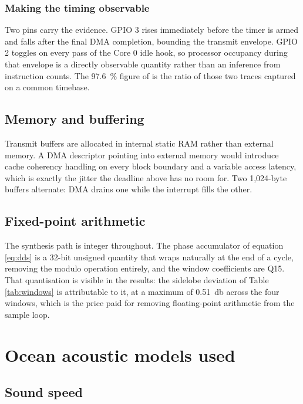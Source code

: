 \documentclass[conference,a4paper]{IEEEtran}
\begin{document}
\subsubsection{Making the timing observable}

Two pins carry the evidence. GPIO 3 rises immediately before the timer is armed
and falls after the final DMA completion, bounding the transmit envelope. GPIO 2
toggles on every pass of the Core 0 idle hook, so processor occupancy during
that envelope is a directly observable quantity rather than an inference from
instruction counts. The \SI{97.6}{\percent} figure of  is the ratio of
those two traces captured on a common timebase.

\subsection{Memory and buffering}

Transmit buffers are allocated in internal static RAM rather than external
memory. A DMA descriptor pointing into external memory would introduce cache
coherency handling on every block boundary and a variable access latency, which
is exactly the jitter the deadline above has no room for. Two 1{,}024-byte
buffers alternate: DMA drains one while the interrupt fills the other.

\subsection{Fixed-point arithmetic}

The synthesis path is integer throughout. The phase accumulator of equation
\eqref{eq:dds} is a 32-bit unsigned quantity that wraps naturally at the end of
a cycle, removing the modulo operation entirely, and the window coefficients are
Q15. That quantisation is visible in the results: the sidelobe deviation of
Table \ref{tab:windows} is attributable to it, at a maximum of
\SI{0.51}{\decibel} across the four windows, which is the price paid for
removing floating-point arithmetic from the sample loop.

\section{Ocean acoustic models used}

\subsection{Sound speed}
\end{document}
